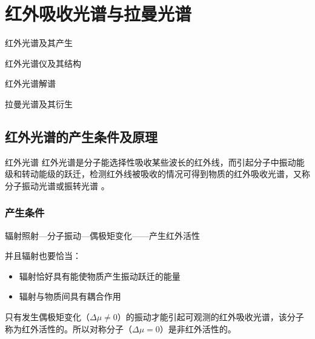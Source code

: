 \chapter{红外吸收光谱与拉曼光谱}
\begin{introduction}
    \item 红外光谱及其产生
    \item 红外光谱仪及其结构
    \item 红外光谱解谱
    \item 拉曼光谱及其衍生
\end{introduction}
\section{红外光谱的产生条件及原理}
\begin{definition*}{红外光谱}
    红外光谱是分子能选择性吸收某些波长的红外线，而引起分子中振动能级和转动能级的跃迁，检测红外线被吸收的情况可得到物质的红外吸收光谱，又称分子振动光谱或振转光谱 。
\end{definition*}
\subsection{产生条件}
辐射照射---分子振动---偶极矩变化------产生红外活性

并且辐射也要恰当：
\begin{itemize}
    \item 辐射恰好具有能使物质产生振动跃迁的能量
    \item 辐射与物质间具有耦合作用
\end{itemize}
\begin{note}
    只有发生偶极矩变化（$\Delta \mu \neq 0$）的振动才能引起可观测的红外吸收光谱，该分子称为红外活性的。所以对称分子（$\Delta \mu=0$）是非红外活性的。
\end{note}

